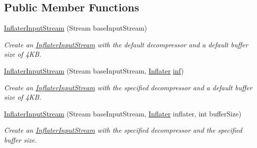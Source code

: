 \subsection*{Public Member Functions}
\begin{DoxyCompactItemize}
\item 
\hyperlink{class_i_c_sharp_code_1_1_sharp_zip_lib_1_1_zip_1_1_compression_1_1_streams_1_1_inflater_input_stream_a6e3a380e11673b5851f14c5cec9b08ea}{Inflater\+Input\+Stream} (Stream base\+Input\+Stream)
\begin{DoxyCompactList}\small\item\em Create an \hyperlink{class_i_c_sharp_code_1_1_sharp_zip_lib_1_1_zip_1_1_compression_1_1_streams_1_1_inflater_input_stream}{Inflater\+Input\+Stream} with the default decompressor and a default buffer size of 4\+KB. \end{DoxyCompactList}\item 
\hyperlink{class_i_c_sharp_code_1_1_sharp_zip_lib_1_1_zip_1_1_compression_1_1_streams_1_1_inflater_input_stream_a3be51c98d69f9420259ea0a2a081dcd1}{Inflater\+Input\+Stream} (Stream base\+Input\+Stream, \hyperlink{class_i_c_sharp_code_1_1_sharp_zip_lib_1_1_zip_1_1_compression_1_1_inflater}{Inflater} \hyperlink{class_i_c_sharp_code_1_1_sharp_zip_lib_1_1_zip_1_1_compression_1_1_streams_1_1_inflater_input_stream_a3466996b573725de7021f7a74958514b}{inf})
\begin{DoxyCompactList}\small\item\em Create an \hyperlink{class_i_c_sharp_code_1_1_sharp_zip_lib_1_1_zip_1_1_compression_1_1_streams_1_1_inflater_input_stream}{Inflater\+Input\+Stream} with the specified decompressor and a default buffer size of 4\+KB. \end{DoxyCompactList}\item 
\hyperlink{class_i_c_sharp_code_1_1_sharp_zip_lib_1_1_zip_1_1_compression_1_1_streams_1_1_inflater_input_stream_af988bfe68d18362c690e6f7cb0e7c0eb}{Inflater\+Input\+Stream} (Stream base\+Input\+Stream, \hyperlink{class_i_c_sharp_code_1_1_sharp_zip_lib_1_1_zip_1_1_compression_1_1_inflater}{Inflater} inflater, int buffer\+Size)
\begin{DoxyCompactList}\small\item\em Create an \hyperlink{class_i_c_sharp_code_1_1_sharp_zip_lib_1_1_zip_1_1_compression_1_1_streams_1_1_inflater_input_stream}{Inflater\+Input\+Stream} with the specified decompressor and the specified buffer size. \end{DoxyCompactList}\item 

\end{DoxyCompactItemize}
